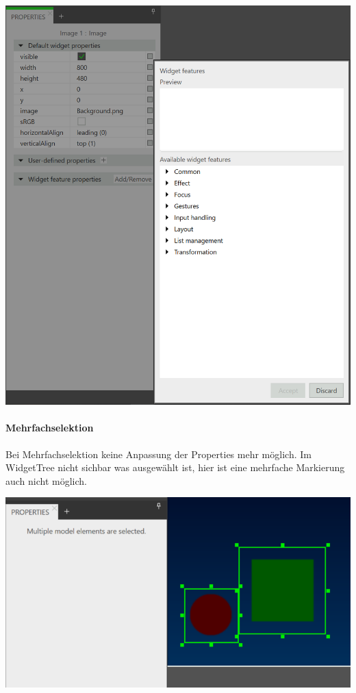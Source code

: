 \begin{center}
  \includegraphics[scale=0.5]{figures/WidgetFeatureProperty.png}
  \label{fig:WidgetFeatureProperty}
\end{center}


\paragraph{Mehrfachselektion}
Bei Mehrfachselektion keine Anpassung der Properties mehr möglich. Im WidgetTree nicht sichbar was ausgewählt ist, hier ist eine mehrfache Markierung auch nicht möglich.

\begin{center}
  \includegraphics[scale=0.8]{figures/Mehrfachselektion.png}
  \label{fig:Mehrfachselektion}
\end{center}


